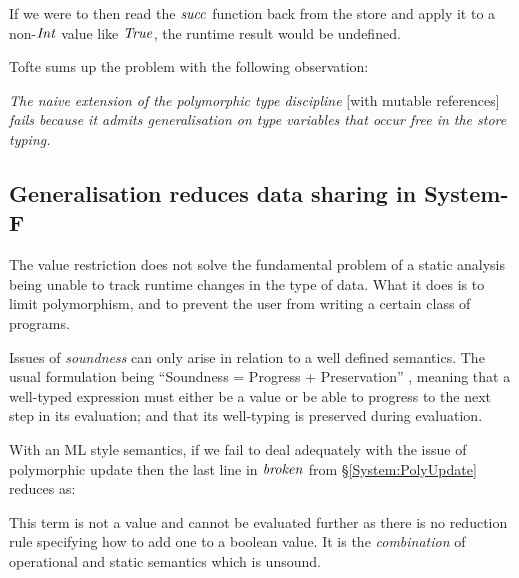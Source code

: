 
If we were to then read the $\operatorname{\mathit{succ}}$ function back from the store and apply it to a non-$\operatorname{\mathit{Int}}$ value like $\operatorname{\mathit{True}}$, the runtime result would be undefined.

Tofte sums up the problem with the following observation:
\begin{center}
\begin{minipage}{30em}
\emph{The naive extension of the polymorphic type discipline} [with mutable references] \emph{fails because
it admits generalisation on type variables that occur free in the store typing.}
\end{minipage}
\end{center}


\subsection{Generalisation reduces data sharing in System-F}
\label{System:PolyUpdate:Sharing}
The value restriction does not solve the fundamental problem of a static analysis being unable to track runtime changes in the type of data. What it does is to limit polymorphism, and to prevent the user from writing a certain class of programs.

Issues of \emph{soundness} can only arise in relation to a well defined semantics. The usual formulation being ``Soundness = Progress + Preservation'' \cite{pierce:tapl}, meaning that a well-typed expression must either be a value or be able to progress to the next step in its evaluation; and that its well-typing is preserved during evaluation.

With an ML style semantics, if we fail to deal adequately with the issue of polymorphic update then the last line in $\operatorname{\mathit{broken}}$ from \S\ref{System:PolyUpdate} reduces as:


This term is not a value and cannot be evaluated further as there is no reduction rule specifying how to add one to a boolean value. It is the \emph{combination} of operational and static semantics which is unsound.


